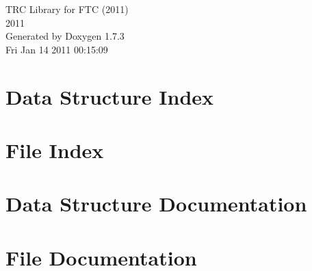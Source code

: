 \documentclass[a4paper]{book}
\begin{document}
\hypersetup{pageanchor=false}
\begin{titlepage}
\vspace*{7cm}
\begin{center}
{\Large TRC Library for FTC (2011) \\[1ex]\large 2011 }\\
\vspace*{1cm}
{\large Generated by Doxygen 1.7.3}\\
\vspace*{0.5cm}
{\small Fri Jan 14 2011 00:15:09}\\
\end{center}
\end{titlepage}
\clearemptydoublepage
{}
\tableofcontents
\clearemptydoublepage
{}
\hypersetup{pageanchor=true}
\chapter{Data Structure Index}

\chapter{File Index}

\chapter{Data Structure Documentation}


















\chapter{File Documentation}


















\printindex
\end{document}
